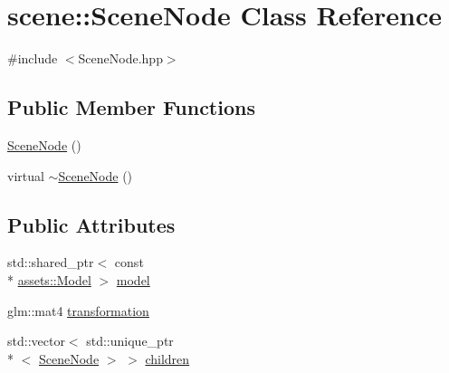 \hypertarget{classscene_1_1SceneNode}{\section{scene\-:\-:Scene\-Node Class Reference}
\label{classscene_1_1SceneNode}
}


{\ttfamily \#include $<$Scene\-Node.\-hpp$>$}

\subsection*{Public Member Functions}
\begin{DoxyCompactItemize}
\item 
\hyperlink{classscene_1_1SceneNode_aecbf0c84cabc996a2cf44076914d3b0a}{Scene\-Node} ()
\item 
virtual \hyperlink{classscene_1_1SceneNode_a0711f87a5f33b59e296618d68b22a20a}{$\sim$\-Scene\-Node} ()
\end{DoxyCompactItemize}
\subsection*{Public Attributes}
\begin{DoxyCompactItemize}
\item 
std\-::shared\-\_\-ptr$<$ const \\*
\hyperlink{classassets_1_1Model}{assets\-::\-Model} $>$ \hyperlink{classscene_1_1SceneNode_afe99ae8f79ad4b4fe5ff866227b5922f}{model}
\item 
glm\-::mat4 \hyperlink{classscene_1_1SceneNode_af5a0e6b3540fd9b070f6797ed14f079d}{transformation}
\item 
std\-::vector$<$ std\-::unique\-\_\-ptr\\*
$<$ \hyperlink{classscene_1_1SceneNode}{Scene\-Node} $>$ $>$ \hyperlink{classscene_1_1SceneNode_a66b33dd812436689d350f688121d7c0c}{children}
\end{DoxyCompactItemize}


